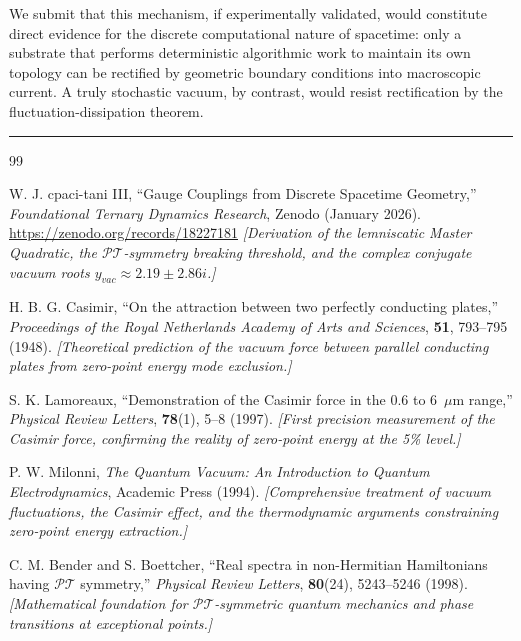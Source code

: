 \documentclass[11pt, letterpaper]{article}
\newcommand{\PT}{\mathcal{PT}}
\theoremstyle{definition}
\theoremstyle{remark}
\begin{document}
We submit that this mechanism, if experimentally validated, would constitute direct evidence for the discrete computational nature of spacetime: only a substrate that performs deterministic algorithmic work to maintain its own topology can be rectified by geometric boundary conditions into macroscopic current. A truly stochastic vacuum, by contrast, would resist rectification by the fluctuation-dissipation theorem.

\vspace{2em}
\hrule
\vspace{1.5em}

\begin{thebibliography}{99}

W. J. cpaci-tani III,
``Gauge Couplings from Discrete Spacetime Geometry,''
\textit{Foundational Ternary Dynamics Research}, Zenodo (January 2026).
\url{https://zenodo.org/records/18227181}
\newblock \textit{[Derivation of the lemniscatic Master Quadratic, the $\PT$-symmetry breaking threshold, and the complex conjugate vacuum roots $y_{vac} \approx 2.19 \pm 2.86i$.]}

H. B. G. Casimir,
``On the attraction between two perfectly conducting plates,''
\textit{Proceedings of the Royal Netherlands Academy of Arts and Sciences}, \textbf{51}, 793--795 (1948).
\newblock \textit{[Theoretical prediction of the vacuum force between parallel conducting plates from zero-point energy mode exclusion.]}

S. K. Lamoreaux,
``Demonstration of the Casimir force in the 0.6 to 6~$\mu$m range,''
\textit{Physical Review Letters}, \textbf{78}(1), 5--8 (1997).
\newblock \textit{[First precision measurement of the Casimir force, confirming the reality of zero-point energy at the 5\% level.]}

P. W. Milonni,
\textit{The Quantum Vacuum: An Introduction to Quantum Electrodynamics},
Academic Press (1994).
\newblock \textit{[Comprehensive treatment of vacuum fluctuations, the Casimir effect, and the thermodynamic arguments constraining zero-point energy extraction.]}

C. M. Bender and S. Boettcher,
``Real spectra in non-Hermitian Hamiltonians having $\mathcal{PT}$ symmetry,''
\textit{Physical Review Letters}, \textbf{80}(24), 5243--5246 (1998).
\newblock \textit{[Mathematical foundation for $\PT$-symmetric quantum mechanics and phase transitions at exceptional points.]}


\end{thebibliography}
\end{document}
